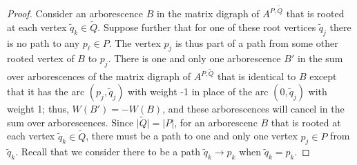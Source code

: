 \documentclass[10pt,a4paper]{amsart}
\begin{document}
\begin{proof}
Consider an arborescence $B$ in the matrix digraph of $A^{P, \tilde{Q}}$ that
is rooted at each vertex $\tilde{q}_k \in \tilde{Q}$.  Suppose further that
for one of these root vertices $\tilde{q}_j$ there is no path to any
$p_\ell \in P$.  The vertex $p_j$ is thus part of a path from some other
rooted vertex of $B$ to $p_j$.  There is one and only one arborescence
 $B'$ in the
sum over arborescences of the matrix digraph of $A^{P, \tilde{Q}}$ that is
identical to $B$ except that it has the arc $(p_j, \tilde{q}_j)$ with weight
-1 in place of the arc $(0, \tilde{q}_j)$ with weight 1; thus,
$W(B') = -W(B)$, and these arborescences will cancel in the sum over
arborescences.
Since $\vert \tilde{Q} \vert = \vert P \vert$, for an arborescenc $B$ that
is rooted at each vertex $\tilde{q}_k \in \tilde{Q}$, there must
be a path to one and only one vertex $p_j \in P$ from $\tilde{q}_k$.
Recall that we consider
there to be a path $\tilde{q}_k \to p_k$ when $\tilde{q}_k = p_k$.


\end{proof}
\end{document}

